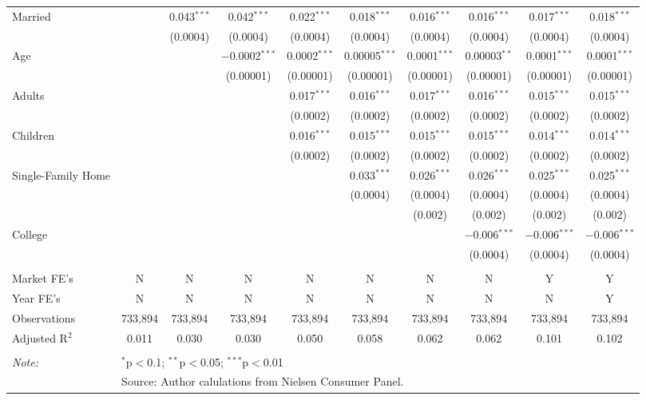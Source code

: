 \begin{table}[!htbp]
{\begin{tabular}{@{\extracolsep{5pt}}lccccccccc}
  Married &  & 0.043$^{***}$ & 0.042$^{***}$ & 0.022$^{***}$ & 0.018$^{***}$ & 0.016$^{***}$ & 0.016$^{***}$ & 0.017$^{***}$ & 0.018$^{***}$ \\
  &  & (0.0004) & (0.0004) & (0.0004) & (0.0004) & (0.0004) & (0.0004) & (0.0004) & (0.0004) \\
  Age &  &  & $-$0.0002$^{***}$ & 0.0002$^{***}$ & 0.00005$^{***}$ & 0.0001$^{***}$ & 0.00003$^{**}$ & 0.0001$^{***}$ & 0.0001$^{***}$ \\
  &  &  & (0.00001) & (0.00001) & (0.00001) & (0.00001) & (0.00001) & (0.00001) & (0.00001) \\
  Adults &  &  &  & 0.017$^{***}$ & 0.016$^{***}$ & 0.017$^{***}$ & 0.016$^{***}$ & 0.015$^{***}$ & 0.015$^{***}$ \\
  &  &  &  & (0.0002) & (0.0002) & (0.0002) & (0.0002) & (0.0002) & (0.0002) \\
  Children &  &  &  & 0.016$^{***}$ & 0.015$^{***}$ & 0.015$^{***}$ & 0.015$^{***}$ & 0.014$^{***}$ & 0.014$^{***}$ \\
  &  &  &  & (0.0002) & (0.0002) & (0.0002) & (0.0002) & (0.0002) & (0.0002) \\
  Single-Family Home &  &  &  &  & 0.033$^{***}$ & 0.026$^{***}$ & 0.026$^{***}$ & 0.025$^{***}$ & 0.025$^{***}$ \\
  &  &  &  &  & (0.0004) & (0.0004) & (0.0004) & (0.0004) & (0.0004) \\
  &  &  &  &  &  & (0.002) & (0.002) & (0.002) & (0.002) \\
  College &  &  &  &  &  &  & $-$0.006$^{***}$ & $-$0.006$^{***}$ & $-$0.006$^{***}$ \\
  &  &  &  &  &  &  & (0.0004) & (0.0004) & (0.0004) \\
 \hline \\[-1.8ex]
Market FE's & N & N & N & N & N & N & N & Y & Y \\
Year FE's & N & N & N & N & N & N & N & N & Y \\
Observations & 733,894 & 733,894 & 733,894 & 733,894 & 733,894 & 733,894 & 733,894 & 733,894 & 733,894 \\
Adjusted R$^{2}$ & 0.011 & 0.030 & 0.030 & 0.050 & 0.058 & 0.062 & 0.062 & 0.101 & 0.102 \\
\hline
\hline \\[-1.8ex]
\textit{Note:}  & \multicolumn{9}{l}{$^{*}$p$<$0.1; $^{**}$p$<$0.05; $^{***}$p$<$0.01} \\
 & \multicolumn{9}{l}{Source: Author calulations from Nielsen Consumer Panel.} \\
\end{tabular}
}
\end{table}
